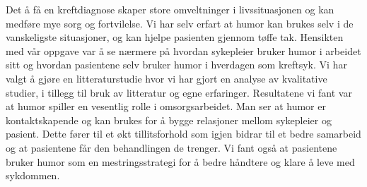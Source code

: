 Det å få en kreftdiagnose skaper store omveltninger i livssituasjonen og kan
medføre mye sorg og fortvilelse. Vi har selv erfart at humor kan brukes selv i
de vanskeligste situasjoner, og kan hjelpe pasienten gjennom tøffe tak.
Hensikten med vår oppgave var å se nærmere på hvordan sykepleier bruker humor i
arbeidet sitt og hvordan pasientene selv bruker humor i hverdagen som kreftsyk.
Vi har valgt å gjøre en litteraturstudie hvor vi har gjort en analyse av
kvalitative studier, i tillegg til bruk av litteratur og egne erfaringer.
Resultatene vi fant var at humor spiller en vesentlig rolle i omsorgsarbeidet.
Man ser at humor er kontaktskapende og kan brukes for å bygge relasjoner mellom
sykepleier og pasient. Dette fører til et økt tillitsforhold som igjen bidrar
til et bedre samarbeid og at pasientene får den behandlingen de trenger. Vi
fant også at pasientene bruker humor som en mestringsstrategi for å bedre
håndtere og klare å leve med sykdommen.
